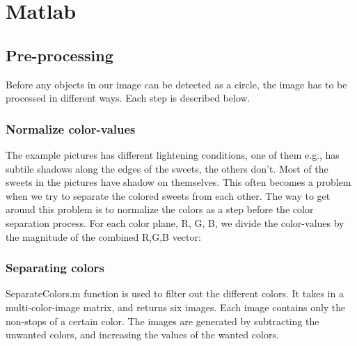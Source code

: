 \lstset{language=Matlab}
\lstset{frame=single}
\section{Matlab}
\subsection{Pre-processing}
Before any objects in our image can be detected as a circle, the image has to be processed in different ways. Each step is described below.

\subsubsection{Normalize color-values}
The example pictures has different lightening conditions, one of them e.g., has subtile shadows along the edges of the sweets, the others don't. Most of the sweets in the pictures have shadow on themselves. This often becomes a problem when we try to separate the colored sweets from each other. The way to get around this problem is to normalize the colors as a step before the color separation process. For each color plane, R, G, B, we divide the color-values by the magnitude of the combined R,G,B vector:
\\


\subsubsection{Separating colors}
SeparateColors.m function is used to filter out the different colors. It takes in a multi-color-image matrix, and returns six images. Each image contains only the non-stops of a certain color. The images are generated by subtracting the unwanted colors, and increasing the values of the wanted colors.

